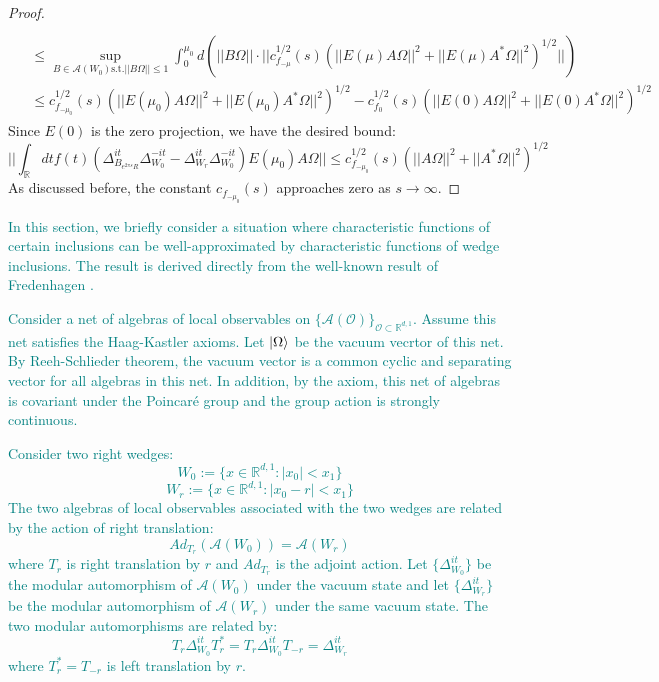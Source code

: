 \documentclass[a4paper,11pt]{article}
\theoremstyle{definition}
\newcommand{\lb}{\left(}
\newcommand{\rb}{\right)}
\newcommand{\YC}[1]{\textcolor{teal}{#1}}
\begin{document}
\begin{proof}
\begin{align}
\begin{split}
        \\&
        \leq \sup_{B\in\mathcal{A}(W_0)\text{s.t.}||B\Omega||\leq 1}\int_0^{\mu_0}d\lb||B\Omega||\cdot||c^{1/2}_{f_{-\mu}}(s)\lb||E(\mu)A\Omega||^2 + ||E(\mu)A^*\Omega||^2\rb^{1/2}||\rb
        \\&
        \leq c^{1/2}_{f_{-\mu_0}}(s)\lb||E(\mu_0)A\Omega||^2 + ||E(\mu_0)A^*\Omega||^2\rb^{1/2} - c^{1/2}_{f_0}(s)\lb||E(0)A\Omega||^2 + ||E(0)A^*\Omega||^2\rb^{1/2}
    \end{split}
\end{align}
Since $E(0)$ is the zero projection, we have the desired bound:
\begin{equation}
    ||\int_\mathbb{R} dt f(t)\lb\Delta_{B_{e^{2
        \pi s}R}}^{it}\Delta_{W_0}^{-it} - \Delta_{W_r}^{it}\Delta_{W_0}^{-it}\rb E(\mu_0)A\Omega|| \leq c_{f_{-\mu_0}}^{1/2}(s)\lb||A\Omega||^2 + ||A^*\Omega||^2\rb^{1/2}
\end{equation}
As discussed before, the constant $c_{f_{-\mu_0}}(s)$ approaches zero as $s\rightarrow\infty$.
\end{proof}

\YC{
In this section, we briefly consider a situation where characteristic functions of certain inclusions can be well-approximated by characteristic functions of wedge inclusions. The result is derived directly from the well-known result of Fredenhagen \cite{fredenhagen}.}

\YC{
Consider a net of algebras of local observables on $\{\mathcal{A}(\mathcal{O})\}_{\mathcal{O}\subset\mathbb{R}^{d,1}}$. Assume this net satisfies the Haag-Kastler axioms. Let $\ket{\Omega}$ be the vacuum vecrtor of this net. By Reeh-Schlieder theorem, the vacuum vector is a common cyclic and separating vector for all algebras in this net. In addition, by the axiom, this net of algebras is covariant under the Poincaré group and the group action is strongly continuous.}

\YC{
Consider two right wedges:
\begin{equation}
    W_0 := \{x\in\mathbb{R}^{d,1}: |x_0| < x_1\}
\end{equation}
\begin{equation}
    W_{r} := \{x\in\mathbb{R}^{d,1}: |x_0 - r| < x_1 \}
\end{equation}
The two algebras of local observables associated with the two wedges are related by the action of right translation:
\begin{equation}
    Ad_{T_r}(\mathcal{A}(W_0)) = \mathcal{A}(W_r)
\end{equation}
where $T_r$ is right translation by $r$ and $Ad_{T_r}$ is the adjoint action. Let $\{\Delta_{W_0}^{it}\}$ be the modular automorphism of $\mathcal{A}(W_0)$ under the vacuum state and let $\{\Delta_{W_r}^{it}\}$ be the modular automorphism of $\mathcal{A}(W_r)$ under the same vacuum state. The two modular automorphisms are related by:
\begin{equation}
    T_r\Delta_{W_0}^{it}T_r^* = T_r\Delta_{W_0}^{it}T_{-r} = \Delta^{it}_{W_r}
\end{equation}
where $T_r^* = T_{-r}$ is left translation by $r$.
}
\end{document}
